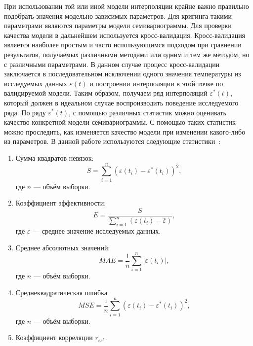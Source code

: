 При использовании той или иной модели интерполяции крайне важно правильно подобрать значения модельно-зависимых параметров. Для кригинга такими параметрами являются параметры модели семивариограммы. Для проверки качества модели в дальнейшем используется кросс-валидация. Кросс-валидация является наиболее простым и часто использующимся подходом при сравнении результатов, получаемых различными методами или одним и тем же методом, но с различными параметрами. В данном случае процесс кросс-валидации заключается в последовательном исключении одного значения температуры из исследуемых данных $ \varepsilon(t) $ и построении интерполяции в этой точке по валидируемой модели. Таким образом, получаем ряд интерполяций $ \varepsilon^{*}(t) $, который должен в идеальном случае воспроизводить поведение исследуемого ряда. По ряду $ \varepsilon^{*}(t) $, с помощью различных статистик можно оценивать качество конкретной модели семивариограммы. С помощью таких статистик можно проследить, как изменяется качество модели при изменении какого-либо из параметров. В данной работе используются следующие статистики~\cite{saveliev2012}:
\begin{enumerate}
	\item Сумма квадратов невязок:
	\begin{equation*}
		S = \sum_{i = 1}^{n} {(\varepsilon(t_i) - \varepsilon^{*}(t_i))}^2,
	\end{equation*}
	где $ n $ --- объём выборки.
	\item Коэффициент эффективности:
	\begin{equation*}
		E = \frac{S}{\sum_{i=1}^{n}(\varepsilon(t_i) - \bar{\varepsilon})},
	\end{equation*}
	где $ \bar{\varepsilon} $ --- среднее значение исследуемых данных.
	\item Среднее абсолютных значений:
	\begin{equation*}
		MAE = \frac{1}{n} \sum_{i=1}^{n} | \varepsilon(t_i) |,
	\end{equation*}
	где $ n $ --- объём выборки.
	\item Среднеквадратическая ошибка
	\begin{equation}
	\label{eq:mse}
		MSE = \frac{1}{n} \sum_{i=1}^{n} {(\varepsilon(t_i) - \varepsilon^{*}(t_i))}^2,
	\end{equation}
	где $ n $ --- объём выборки.
	\item Коэффициент корреляции $ r_{\varepsilon\varepsilon^{*}}. $
\end{enumerate}

